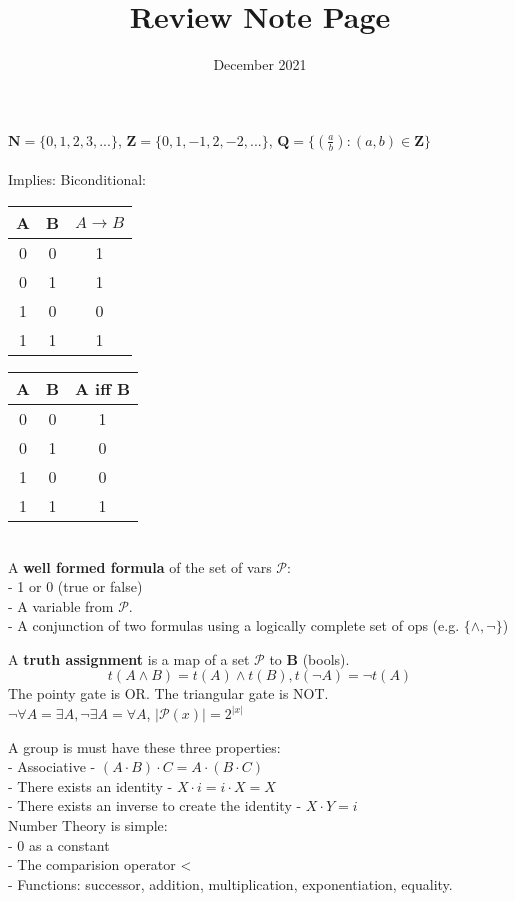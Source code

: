 \documentclass[10pt]{report}
\title{Review Note Page}
\author{}
\date{December 2021}
\begin{document}
\scriptsize
$\textbf{N} = \{ 0, 1, 2, 3, ...\}$,
$\textbf{Z} = \{0, 1, -1, 2, -2, ...\}$,
$\textbf{Q} = \{\left(\frac{a}{b}\right): (a, b) \in \textbf{Z}\}$ \\\\
Implies: \hspace{4cm} Biconditional:\\
\begin{tabular}{c|c|c}
    A & B & $A \rightarrow B$ \\
    \hline
    0 & 0 & 1 \\
    0 & 1 & 1 \\
    1 & 0 & 0 \\
    1 & 1 & 1 \\
\end{tabular} \hspace{2cm}
\begin{tabular}{c|c|c}
    A & B & A iff B \\
    \hline
    0 & 0 & 1 \\
    0 & 1 & 0 \\
    1 & 0 & 0 \\
    1 & 1 & 1 \\
\end{tabular} \\

A \textbf{well formed formula} of the set of vars $\mathcal{P}$: \\
- 1 or 0 (true or false) \\
- A variable from $\mathcal{P}$. \\
- A conjunction of two formulas using a logically complete set of ops (e.g. $\{\wedge, \neg\}$)

A \textbf{truth assignment} is a map of a set $\mathcal{P}$ to $\mathbf{B}$ (bools). \\
\[t(A \wedge B) = t(A) \wedge t(B), t(\neg{A}) = \neg{t(A)}\]
The pointy gate is OR. The triangular gate is NOT. \\
$\neg{\forall A} = \exists A, \neg{\exists A} = \forall A$,
$|\mathcal{P}(x)| = 2^{|x|}$

A group is must have these three properties: \\
- Associative - $(A \cdot B) \cdot C = A \cdot (B \cdot C)$ \\
- There exists an identity - $X \cdot i = i \cdot X = X$ \\
- There exists an inverse to create the identity - $X \cdot Y = i$ \\

Number Theory is simple: \\
- 0 as a constant \\
- The comparision operator < \\
- Functions: successor, addition, multiplication, exponentiation, equality. \\
\end{document}
